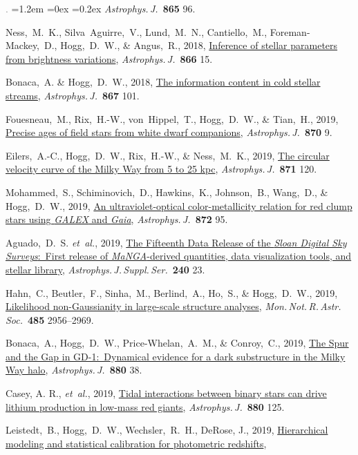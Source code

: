 \documentclass[10pt,letterpaper]{article}
\newcommand{\foreign}[1]{\textsl{#1}}
\newcommand{\etal}{\foreign{et~al.}}
\newcommand{\project}[1]{\textsl{#1}}
\newcommand{\doi}[2]{\href{http://dx.doi.org/#1}{{#2}}}
\newcommand{\deemph}[1]{\textcolor{grey}{\footnotesize{#1}}}
\newcommand{\pubnumber}[1]{\deemph{{#1}.}}
\newcounter{refpubnum}
\newcommand{\hogglist}{%
    \rightmargin=0in
    \leftmargin=1.2em
    \topsep=0ex
    \partopsep=0pt
    \itemsep=0.2ex
    \parsep=0pt
    \itemindent=-1.0\leftmargin
    \listparindent=0.0\leftmargin
    \settowidth{\labelsep}{~}
    \usecounter{refpubnum}
  }
\begin{document}
\begin{list}{\pubnumber{\therefpubnum}}{\hogglist}
\textit{Astrophys.\,J.}\ \textbf{865} 96.
\item
Ness,~M.~K., Silva~Aguirre,~V., Lund,~M.~N., Cantiello,~M., Foreman-Mackey,~D.,
Hogg,~D.~W., \& Angus,~R., 2018,
\doi{10.3847/1538-4357/aadb40}{Inference of stellar parameters from brightness variations},
\textit{Astrophys.\,J.}\ \textbf{866} 15.
\item
Bonaca,~A. \& Hogg,~D.~W., 2018,
\doi{10.3847/1538-4357/aae4da}{The information content in cold stellar streams},
\textit{Astrophys.\,J.}\ \textbf{867} 101.
\item
Fouesneau,~M., Rix,~H.-W., von~Hippel,~T., Hogg,~D.~W., \& Tian,~H., 2019,
\doi{10.3847/1538-4357/aaee74}{Precise ages of field stars from white dwarf companions},
\textit{Astrophys.\,J.}\ \textbf{870} 9.
\item
Eilers,~A.-C., Hogg,~D.~W., Rix,~H.-W., \& Ness,~M.~K., 2019,
\doi{10.3847/1538-4357/aaf648}{The circular velocity curve of the Milky Way from 5 to 25 kpc},
\textit{Astrophys.\,J.}\ \textbf{871} 120.
\item
Mohammed,~S., Schiminovich,~D., Hawkins,~K., Johnson,~B., Wang,~D., \& Hogg,~D.~W., 2019,
\doi{10.3847/1538-4357/aaf236}{An ultraviolet-optical color-metallicity relation for red clump stars using \project{GALEX} and \project{Gaia}},
\textit{Astrophys.\,J.}\ \textbf{872} 95.
\item
Aguado,~D.~S. \etal, 2019,
\doi{10.3847/1538-4365/aaf651}{The Fifteenth Data Release of the \project{Sloan Digital Sky Surveys}:\ First release of \project{MaNGA}-derived quantities, data visualization tools, and stellar library},
\textit{Astrophys.\,J.\,Suppl.\,Ser.}\ \textbf{240} 23.
\item
Hahn,~C., Beutler,~F., Sinha,~M., Berlind,~A., Ho,~S., \& Hogg,~D.~W., 2019,
\doi{10.1093/mnras/stz558}{Likelihood non-Gaussianity in large-scale structure analyses},
\textit{Mon.\,Not.\,R.\,Astr.\,Soc.}\ \textbf{485} 2956--2969.
\item
Bonaca,~A., Hogg,~D.~W., Price-Whelan,~A.~M., \& Conroy,~C., 2019,
\doi{10.3847/1538-4357/ab2873}{The Spur and the Gap in GD-1:\ Dynamical evidence for a dark substructure in the Milky Way halo},
\textit{Astrophys.\,J.}\ \textbf{880} 38.
\item
Casey, A. R., \etal, 2019,
\doi{10.3847/1538-4357/ab27bf}{Tidal interactions between binary stars can drive lithium production in low-mass red giants},
\textit{Astrophys.\,J.}\ \textbf{880} 125.
\item
Leistedt,~B., Hogg,~D.~W., Wechsler,~R.~H., DeRose, J., 2019,
\doi{10.3847/1538-4357/ab2d29}{Hierarchical modeling and statistical calibration for photometric redshifts},

\end{list}
\end{document}

